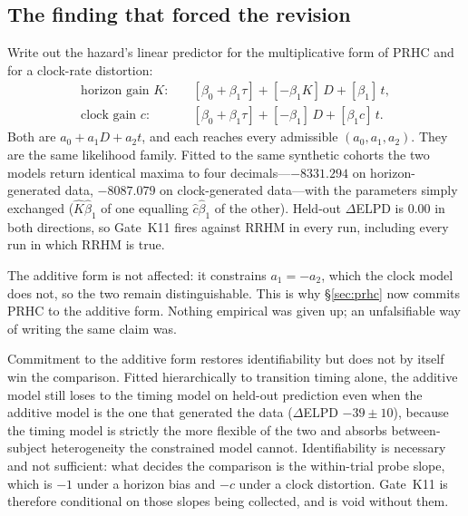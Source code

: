 \documentclass[9pt,twocolumn]{article}
\begin{document}
\subsection{The finding that forced the revision}
Write out the hazard's linear predictor for the multiplicative form of PRHC and for a clock-rate distortion:
\begin{align*}
\text{horizon gain } K:&\quad [\beta_0+\beta_1\tau] + [-\beta_1 K]\,D + [\beta_1]\,t,\\
\text{clock gain } c:&\quad [\beta_0+\beta_1\tau] + [-\beta_1]\,D + [\beta_1 c]\,t.
\end{align*}
Both are $a_0+a_1D+a_2t$, and each reaches every admissible $(a_0,a_1,a_2)$. They are the same likelihood family. Fitted to the same synthetic cohorts the two models return identical maxima to four decimals---$-8331.294$ on horizon-generated data, $-8087.079$ on clock-generated data---with the parameters simply exchanged ($\hat K\hat\beta_1$ of one equalling $\hat c\hat\beta_1$ of the other). Held-out $\Delta$ELPD is $0.00$ in both directions, so Gate~K11 fires against RRHM in every run, including every run in which RRHM is true.

The additive form is not affected: it constrains $a_1=-a_2$, which the clock model does not, so the two remain distinguishable. This is why \S\ref{sec:prhc} now commits PRHC to the additive form. Nothing empirical was given up; an unfalsifiable way of writing the same claim was.

Commitment to the additive form restores identifiability but does not by itself win the comparison. Fitted hierarchically to transition timing alone, the additive model still loses to the timing model on held-out prediction even when the additive model is the one that generated the data ($\Delta$ELPD $-39\pm10$), because the timing model is strictly the more flexible of the two and absorbs between-subject heterogeneity the constrained model cannot. Identifiability is necessary and not sufficient: what decides the comparison is the within-trial probe slope, which is $-1$ under a horizon bias and $-c$ under a clock distortion. Gate~K11 is therefore conditional on those slopes being collected, and is void without them.
\end{document}

